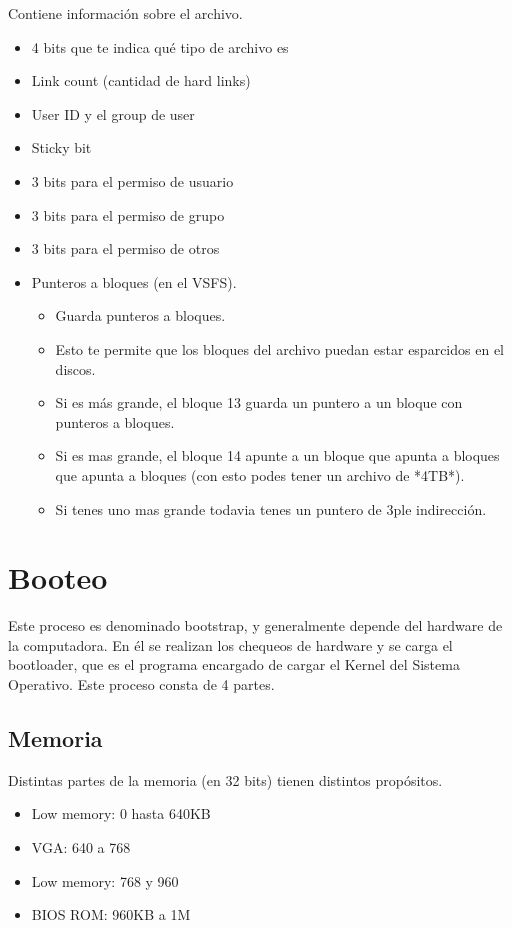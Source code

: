 \documentclass{article}
\begin{document}
Contiene información sobre el archivo.

\begin{itemize}
\item
  4 bits que te indica qué tipo de archivo es
\item
  Link count (cantidad de hard links)
\item
  User ID y el group de user
\item
  Sticky bit
\item
  3 bits para el permiso de usuario
\item
  3 bits para el permiso de grupo
\item
  3 bits para el permiso de otros
\item
  Punteros a bloques (en el VSFS).

  \begin{itemize}
  \item
    Guarda punteros a bloques.
  \item
    Esto te permite que los bloques del archivo puedan estar esparcidos
    en el discos.
  \item
    Si es más grande, el bloque 13 guarda un puntero a un bloque con
    punteros a bloques.
  \item
    Si es mas grande, el bloque 14 apunte a un bloque que apunta a
    bloques que apunta a bloques (con esto podes tener un archivo de
    *4TB*).
  \item
    Si tenes uno mas grande todavia tenes un puntero de 3ple
    indirección.
  \end{itemize}
\end{itemize}

\section{Booteo}\label{booteo}

Este proceso es denominado bootstrap, y generalmente depende del
hardware de la computadora. En él se realizan los chequeos de hardware y
se carga el bootloader, que es el programa encargado de cargar el Kernel
del Sistema Operativo. Este proceso consta de 4 partes.

\subsection{Memoria}\label{memoria-1}

Distintas partes de la memoria (en 32 bits) tienen distintos propósitos.

\begin{itemize}
\item
  Low memory: 0 hasta 640KB
\item
  VGA: 640 a 768
\item
  Low memory: 768 y 960
\item
  BIOS ROM: 960KB a 1M
\end{itemize}
\end{document}
